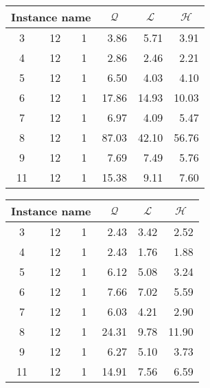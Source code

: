 \begin{table}[H]
\centering
	\begin{tabular}{cccrrr}
		\multicolumn{3}{c}{Instance name}
					& \multicolumn{1}{c}{$\mathcal{Q}$}
									& \multicolumn{1}{c}{$\mathcal{L}$}
													& \multicolumn{1}{c}{$\mathcal{H}$} \\
		\midrule
		 3 & 12 & 1	&  3.86			&  5.71			&  3.91 \\
		 4 & 12 & 1	&  2.86			&  2.46			&  2.21 \\
		 5 & 12 & 1	&  6.50			&  4.03			&  4.10 \\
		 6 & 12 & 1	& 17.86			& 14.93			& 10.03 \\
		 7 & 12 & 1	&  6.97			&  4.09			&  5.47 \\
		 8 & 12 & 1	& 87.03			& 42.10			& 56.76 \\
		 9 & 12 & 1	&  7.69			&  7.49			&  5.76 \\
		11 & 12 & 1	& 15.38			&  9.11			&  7.60 \\
	\end{tabular}
	\quad
	\begin{tabular}{cccrrr}
		\multicolumn{3}{c}{Instance name}
					& \multicolumn{1}{c}{$\mathcal{Q}$}
									& \multicolumn{1}{c}{$\mathcal{L}$}
													& \multicolumn{1}{c}{$\mathcal{H}$} \\
		\midrule
		 3 & 12 & 1	&  2.43			&  3.42			&  2.52 \\
		 4 & 12 & 1	&  2.43			&  1.76			&  1.88 \\
		 5 & 12 & 1	&  6.12			&  5.08			&  3.24 \\
		 6 & 12 & 1	&  7.66			&  7.02			&  5.59 \\
		 7 & 12 & 1	&  6.03			&  4.21			&  2.90 \\
		 8 & 12 & 1	& 24.31			&  9.78			& 11.90 \\
		 9 & 12 & 1	&  6.27			&  5.10			&  3.73 \\
		11 & 12 & 1	& 14.91			&  7.56			&  6.59 \\
	\end{tabular}
	\label{table:benchmark:encoding-comparison}
\end{table}
